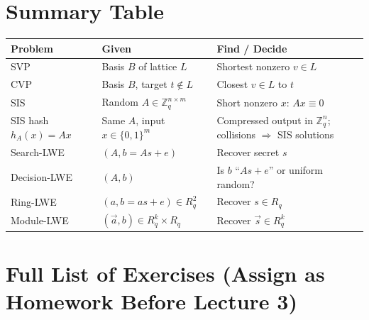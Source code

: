 \section{Summary Table}
\label{sec:L2:summary-table}

\begin{center}
\renewcommand{\arraystretch}{1.3}
\begin{tabular}{|l|l|l|}
\hline
\textbf{Problem} & \textbf{Given} & \textbf{Find / Decide} \\
\hline
SVP & Basis $B$ of lattice $L$ & Shortest nonzero $v \in L$ \\
CVP & Basis $B$, target $t \notin L$ & Closest $v \in L$ to $t$ \\
SIS & Random $A \in \mathbb{Z}_q^{n\times m}$ & Short nonzero $x$: $Ax\equiv 0$ \\
SIS hash $h_A(x)=Ax$ & Same $A$, input $x\in\{0,1\}^m$ & Compressed output in $\mathbb{Z}_q^n$; collisions $\Rightarrow$ SIS solutions \\
Search-LWE & $(A, b=As+e)$ & Recover secret $s$ \\
Decision-LWE & $(A,b)$ & Is $b$ ``$As+e$'' or uniform random? \\
Ring-LWE & $(a,b=as+e) \in R_q^2$ & Recover $s \in R_q$ \\
Module-LWE & $(\vec a, b) \in R_q^k \times R_q$ & Recover $\vec s \in R_q^k$ \\
\hline
\end{tabular}
\end{center}

\section{Full List of Exercises (Assign as Homework Before Lecture 3)}
\label{sec:L2:full-list-of-exercises-assign-as-homewor}

